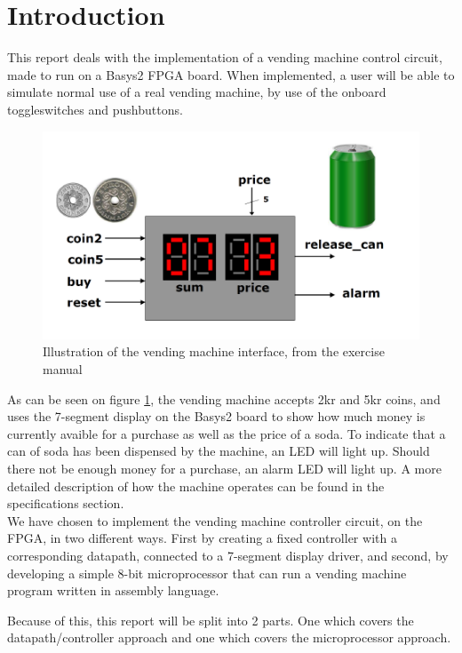\section{Introduction}
This report deals with the implementation of a  vending 
machine control circuit, made to run on a Basys2 FPGA board. When implemented,
a user will be able to simulate normal use of a real vending machine, by use of the onboard toggleswitches and pushbuttons.

\begin{figure}
    \center
    \includegraphics{pictures/vending_interface.png}
    \caption{Illustration of the vending machine interface, from the exercise manual}
    \label{vending_interface}
\end{figure}

As can be seen on figure \ref{vending_interface}, the vending machine accepts
2kr and 5kr coins, and uses the 7-segment display on the Basys2 board to show
how much money is currently avaible for a purchase as well as the price of a soda.
To indicate that a can of soda has been dispensed by the machine, an LED will light up. Should there not be enough money for a purchase, an alarm LED will light up.
A more detailed description of how the machine operates can be found in the specifications section. \\

We have chosen to implement the vending machine controller circuit, on the FPGA, in two different ways.
First by creating a fixed controller with a corresponding datapath, connected to a 7-segment display driver,
and second, by developing a simple 8-bit microprocessor that can run a vending machine program written in assembly language.

Because of this, this report will be split into 2 parts. One which covers the datapath/controller approach
and one which covers the microprocessor approach.

